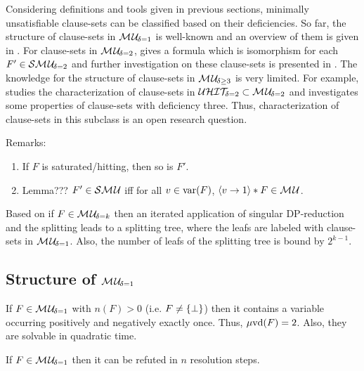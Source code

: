 \documentclass{report}
\begin{document}
Considering definitions and tools given in previous sections, minimally unsatisfiable clause-sets can be classified based on their deficiencies. So far, the structure of clause-sets in $\mathcal{M\hspace{0.8pt}U}_{\!\delta=1}$ is well-known and an overview of them is given in \cite{h9,h27,h24,h32}. For clause-sets in $\mathcal{M\hspace{0.8pt}U}_{\!\delta=2}$, \cite{h24} gives a formula which is isomorphism for each $F' \in \mathcal{S}\mathcal{M\hspace{0.8pt}U}_{\!\delta=2}$ and further investigation on these clause-sets is presented in \cite{h9, h24, h29}. The knowledge for the structure of clause-sets in $\mathcal{M\hspace{0.8pt}U}_{\!\delta \ge 3}$ is very limited. For example, \cite{h26} studies the characterization of clause-sets in $\mathcal{U}\mathcal{HIT}_{\!\!\delta=2} \subset \mathcal{M\hspace{0.8pt}U}_{\!\delta=2}$ and \cite{h9} investigates some properties of clause-sets with deficiency three. Thus, characterization of clause-sets in this subclass is an open research question.

Remarks:
  \begin{enumerate}
  \item If $F$ is saturated/hitting, then so is $F'$.
  \item Lemma???  $F' \in \mathcal{S}\mathcal{M\hspace{0.8pt}U}$ iff for all $v \in \operatorname{var}(F)$, $\langle v \rightarrow 1 \rangle*F \in \mathcal{M\hspace{0.8pt}U}$.
  \end{enumerate} 

\begin{lem}\label{lem:mu-refu-tree}
Based on \cite{h24} if $F \in \mathcal{M\hspace{0.8pt}U}_{\!\delta=k}$ then an iterated application of singular DP-reduction and the splitting leads to a splitting tree, where the leafs are labeled with clause-sets in $\mathcal{M\hspace{0.8pt}U}_{\!\delta=1}$. Also, the number of leafs of the splitting tree is bound by $2^{k-1}$.
\end{lem}

\subsection{Structure of $\mathcal{M\hspace{0.8pt}U}_{\!\delta=1}$}
\label{sec:smu1}

\begin{lem}\label{lem:mu1-uvd}
\cite{h24} If $F \in \mathcal{M\hspace{0.8pt}U}_{\!\delta=1}$ with $n(F) > 0$ (i.e. $F \not = \{ \bot \}$) then it contains a variable occurring positively and negatively exactly once. Thus, $\operatorname{\mu\!\operatorname{vd}}(F) = 2$. Also, they are solvable in quadratic time.
\end{lem}

\begin{lem}\label{lem:mu1-refu-tree}
If $F \in \mathcal{M\hspace{0.8pt}U}_{\!\delta=1}$ then it can be refuted in $n$ resolution steps.
\end{lem}
\end{document}
